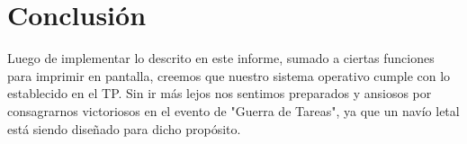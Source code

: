 \section{Conclusión}
\par{Luego de implementar lo descrito en este informe, sumado a ciertas funciones para imprimir en pantalla, creemos que nuestro sistema operativo cumple con lo establecido en el TP. Sin ir más lejos nos sentimos preparados y ansiosos por consagrarnos victoriosos en el evento de "Guerra de Tareas", ya que un navío letal está siendo diseñado para dicho propósito.}